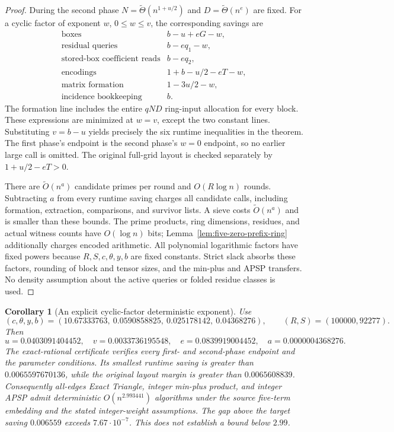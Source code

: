 \documentclass[11pt]{article}
\newtheorem{corollary}[theorem]{Corollary}
\newcommand{\softO}{\widetilde O}
\begin{document}
\begin{proof}
During the second phase $N=\widetilde\Theta(n^{1+u/2})$ and
$D=\widetilde\Theta(n^e)$ are fixed. For a cyclic factor of exponent
$w$, $0\le w\le v$, the corresponding savings are
\[
\begin{array}{ll}
\text{boxes}&b-u+eG-w,\\
\text{residual queries}&b-eq_1-w,\\
\text{stored-box coefficient reads}&b-eq_2,\\
\text{encodings}&1+b-u/2-eT-w,\\
\text{matrix formation}&1-3u/2-w,\\
\text{incidence bookkeeping}&b.
\end{array}
\]
The formation line includes the entire $qND$ ring-input allocation for
every block. These expressions are minimized at $w=v$, except the two
constant lines. Substituting $v=b-u$ yields precisely the six runtime
inequalities in the theorem. The first phase's endpoint is the second
phase's $w=0$ endpoint, so no earlier large call is omitted. The original
full-grid layout is checked separately by $1+u/2-eT>0$.

There are $\softO(n^a)$ candidate primes per round and $O(R\log n)$
rounds. Subtracting $a$ from every runtime saving charges all candidate
calls, including formation, extraction, comparisons, and survivor lists.
A sieve costs $\softO(n^a)$ and is smaller than these bounds. The prime
products, ring dimensions, residues, and actual witness counts have
$O(\log n)$ bits; Lemma~\ref{lem:five-zero-prefix-ring} additionally
charges encoded arithmetic. All polynomial logarithmic factors have
fixed powers because $R,S,c,\theta,y,b$ are fixed constants. Strict
slack absorbs these factors, rounding of block and tensor sizes, and the
min-plus and APSP transfers. No density assumption about the active
queries or folded residue classes is used.
\end{proof}

\begin{corollary}[An explicit cyclic-factor deterministic exponent]
\label{cor:five-ring-apsp}
Use
\[
 (c,\theta,y,b)=(10.67333763,\ 0.0590858825,\ 0.025178142,\ 0.04368276),
 \qquad (R,S)=(100000,92277).
\]
Then
\[
 u=0.0403091404452,\quad v=0.0033736195548,\quad
 e=0.0839919004452,\quad a=0.0000004368276.
\]
The exact-rational certificate verifies every first- and second-phase
endpoint and the parameter conditions. Its smallest runtime saving is
greater than $0.0065597670136$, while the original layout margin is
greater than $0.0065608839$. Consequently all-edges Exact Triangle,
integer min-plus product, and integer APSP admit deterministic
$O(n^{2.993441})$ algorithms under the source five-term embedding and the
stated integer-weight assumptions. The gap above the target saving
$0.006559$ exceeds $7.67\cdot10^{-7}$. This does not establish a bound
below $2.99$.
\end{corollary}
\end{document}
